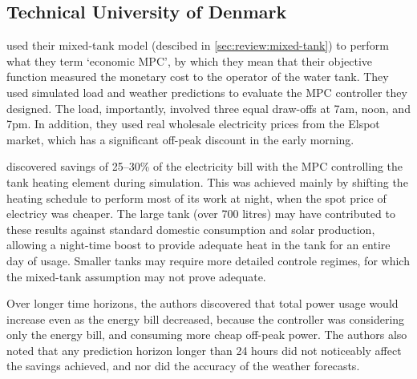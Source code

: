 \subsection{Technical University of Denmark}
\label{sec:review:mpc:halvgaard}

\textcite{Halvgaard12} used their mixed-tank model (descibed in \autoref{sec:review:mixed-tank}) to perform what they term `economic MPC', by which they mean that their objective function measured the monetary cost to the operator of the water tank.
They used simulated load and weather predictions to evaluate the MPC controller they designed.
The load, importantly, involved three equal draw-offs at 7am, noon, and 7pm.
In addition, they used real wholesale electricity prices from the Elspot market, which has a significant off-peak discount in the early morning.

 discovered savings of 25--30\% of the electricity bill with the MPC controlling the tank heating element during simulation.
This was achieved mainly by shifting the heating schedule to perform most of its work at night, when the spot price of electricy was cheaper.
The large tank (over 700 litres) may have contributed to these results against standard domestic consumption and solar production, allowing a night-time boost to provide adequate heat in the tank for an entire day of usage.
Smaller tanks may require more detailed controle regimes, for which the mixed-tank assumption may not prove adequate.

Over longer time horizons, the authors discovered that total power usage would increase even as the energy bill decreased, because the controller was considering only the energy bill, and consuming more cheap off-peak power.
The authors also noted that any prediction horizon longer than 24 hours did not noticeably affect the savings achieved, and nor did the accuracy of the weather forecasts.
